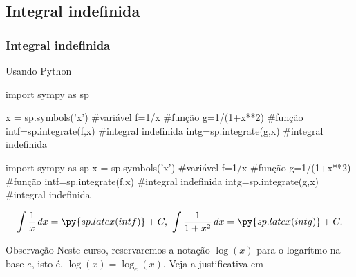 \subsection*{Integral indefinida}
\begin{frame}
\frametitle{ Integral indefinida}
\begin{small}



\end{small}
\end{frame}


\begin{frame}[fragile=singleslide]{Usando Python}
\begin{block}{ }
\begin{pyverbatim}
import sympy as sp

x = sp.symbols('x') #variável
f=1/x #função
g=1/(1+x**2) #função
intf=sp.integrate(f,x) #integral indefinida
intg=sp.integrate(g,x) #integral indefinida
\end{pyverbatim}
\end{block}
\begin{pycode}
import sympy as sp
x = sp.symbols('x') #variável
f=1/x #função
g=1/(1+x**2) #função
intf=sp.integrate(f,x) #integral indefinida
intg=sp.integrate(g,x) #integral indefinida
\end{pycode}

\[\dps \int \frac{1}{x}\, dx=\py{sp.latex(intf)}+C,\ \dps \int \frac{1}{1+x^2}\, dx=\py{sp.latex(intg)}+C.\]

\begin{alertblock}{Observação}
Neste curso, reservaremos a notação $\log(x)$ para o logarítmo na base $e$, isto é, 
$\log(x)=\log_e(x)$. Veja a justificativa em \href{https://reginaldodr.github.io/academic/posts/notacao-log/notacao-log.html}{}
\end{alertblock}

\end{frame}


